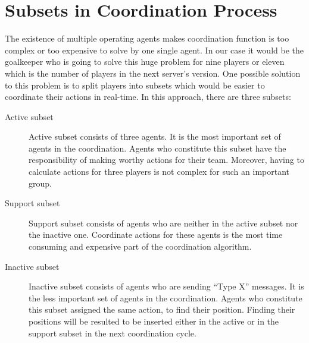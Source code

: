 \section{Subsets in Coordination Process}
The existence of multiple operating agents makes coordination function is too complex or too expensive to solve by one single agent. In our case it would be the goalkeeper who is going to solve this huge problem for nine players or eleven which is the number of players in the next server's version. One possible solution to this problem is to split players into subsets which would be easier to coordinate their actions in real-time. In this approach, there are three subsets:
\begin{description}
\item[Active subset] Active subset consists of three agents. It is the most important set of agents in the coordination. Agents who constitute this subset have the responsibility of making worthy actions for their team. Moreover, having to calculate actions for three players is not complex for such an important group. 

\item[Support subset] Support subset consists of agents who are neither in the active subset nor the inactive one. Coordinate actions for these agents is the most time consuming and expensive part of the coordination algorithm.

\item[Inactive subset]Inactive subset consists of agents who are sending ``Type X'' messages. It is the less important set of agents in the coordination. Agents who constitute this subset assigned the same action, to find their position. Finding their positions will be resulted to be inserted either in the active or in the support subset in the next coordination cycle.
\end{description}

